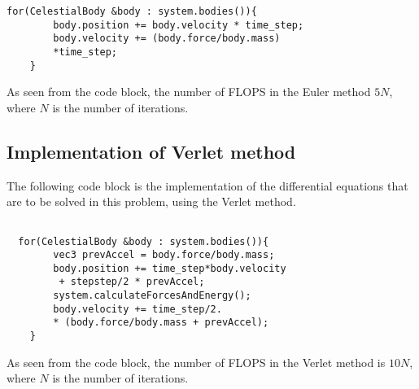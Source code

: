 \begin{lstlisting}[frame=single]
    for(CelestialBody &body : system.bodies()){
        body.position += body.velocity * time_step;
        body.velocity += (body.force/body.mass)
        *time_step;
	} 
\end{lstlisting}

As seen from the code block, the number of FLOPS in the Euler method $5N$, where $N$ is the number of iterations.  

\subsection{Implementation of Verlet method}
The following code block is the implementation of the differential equations that are to be solved in this problem, using the Verlet method. 


\begin{lstlisting}[frame=single]

  for(CelestialBody &body : system.bodies()){
        vec3 prevAccel = body.force/body.mass;
        body.position += time_step*body.velocity
         + stepstep/2 * prevAccel;
        system.calculateForcesAndEnergy();
        body.velocity += time_step/2. 
        * (body.force/body.mass + prevAccel);
    }
\end{lstlisting}
As seen from the code block, the number of FLOPS in the Verlet method is $10N$, where $N$ is the number of iterations. 